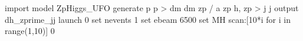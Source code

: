import model ZpHiggs_UFO
generate p p > dm dm zp / a zp h, zp > j j
output dh_zprime_jj
launch
0
set nevents 1
set ebeam 6500
set MH scan:[10*i for i in range(1,10)]
0
